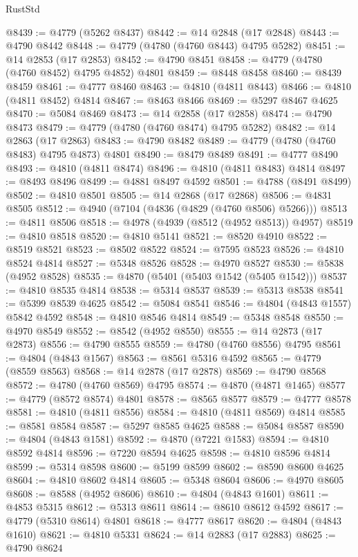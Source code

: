 \begin{lexlean}{RustStd}
\begin{coremodule}
@8439 := @4779 (@5262 @8437)
@8442 := @14 @2848 (@17 @2848)
@8443 := @4790 @8442
@8448 := @4779 (@4780 (@4760 @8443) @4795 @5282)
@8451 := @14 @2853 (@17 @2853)
@8452 := @4790 @8451
@8458 := @4779 (@4780 (@4760 @8452) @4795 @4852) @4801
@8459 := @8448 @8458
@8460 := @8439 @8459
@8461 := @4777 @8460
@8463 := @4810 (@4811 @8443)
@8466 := @4810 (@4811 @8452) @4814
@8467 := @8463 @8466
@8469 := @5297 @8467 @4625
@8470 := @5084 @8469
@8473 := @14 @2858 (@17 @2858)
@8474 := @4790 @8473
@8479 := @4779 (@4780 (@4760 @8474) @4795 @5282)
@8482 := @14 @2863 (@17 @2863)
@8483 := @4790 @8482
@8489 := @4779 (@4780 (@4760 @8483) @4795 @4873) @4801
@8490 := @8479 @8489
@8491 := @4777 @8490
@8493 := @4810 (@4811 @8474)
@8496 := @4810 (@4811 @8483) @4814
@8497 := @8493 @8496
@8499 := @4881 @8497 @4592
@8501 := @4788 (@8491 @8499)
@8502 := @4810 @8501
@8505 := @14 @2868 (@17 @2868)
@8506 := @4831 @8505
@8512 := @4940 (@7104 (@4836 (@4829 (@4760 @8506) @5266)))
@8513 := @4811 @8506
@8518 := @4978 (@4939 (@8512 (@4952 @8513)) @4957)
@8519 := @4810 @8518
@8520 := @4810 @5141
@8521 := @8520 @4910
@8522 := @8519 @8521
@8523 := @8502 @8522
@8524 := @7595 @8523
@8526 := @4810 @8524 @4814
@8527 := @5348 @8526
@8528 := @4970 @8527
@8530 := @5838 (@4952 @8528)
@8535 := @4870 (@5401 (@5403 @1542 (@5405 @1542)))
@8537 := @4810 @8535 @4814
@8538 := @5314 @8537
@8539 := @5313 @8538
@8541 := @5399 @8539 @4625
@8542 := @5084 @8541
@8546 := @4804 (@4843 @1557) @5842 @4592
@8548 := @4810 @8546 @4814
@8549 := @5348 @8548
@8550 := @4970 @8549
@8552 := @8542 (@4952 @8550)
@8555 := @14 @2873 (@17 @2873)
@8556 := @4790 @8555
@8559 := @4780 (@4760 @8556) @4795
@8561 := @4804 (@4843 @1567)
@8563 := @8561 @5316 @4592
@8565 := @4779 (@8559 @8563)
@8568 := @14 @2878 (@17 @2878)
@8569 := @4790 @8568
@8572 := @4780 (@4760 @8569) @4795
@8574 := @4870 (@4871 @1465)
@8577 := @4779 (@8572 @8574) @4801
@8578 := @8565 @8577
@8579 := @4777 @8578
@8581 := @4810 (@4811 @8556)
@8584 := @4810 (@4811 @8569) @4814
@8585 := @8581 @8584
@8587 := @5297 @8585 @4625
@8588 := @5084 @8587
@8590 := @4804 (@4843 @1581)
@8592 := @4870 (@7221 @1583)
@8594 := @4810 @8592 @4814
@8596 := @7220 @8594 @4625
@8598 := @4810 @8596 @4814
@8599 := @5314 @8598
@8600 := @5199 @8599
@8602 := @8590 @8600 @4625
@8604 := @4810 @8602 @4814
@8605 := @5348 @8604
@8606 := @4970 @8605
@8608 := @8588 (@4952 @8606)
@8610 := @4804 (@4843 @1601)
@8611 := @4853 @5315
@8612 := @5313 @8611
@8614 := @8610 @8612 @4592
@8617 := @4779 (@5310 @8614) @4801
@8618 := @4777 @8617
@8620 := @4804 (@4843 @1610)
@8621 := @4810 @5331
@8624 := @14 @2883 (@17 @2883)
@8625 := @4790 @8624

\end{coremodule}
\end{lexlean}
